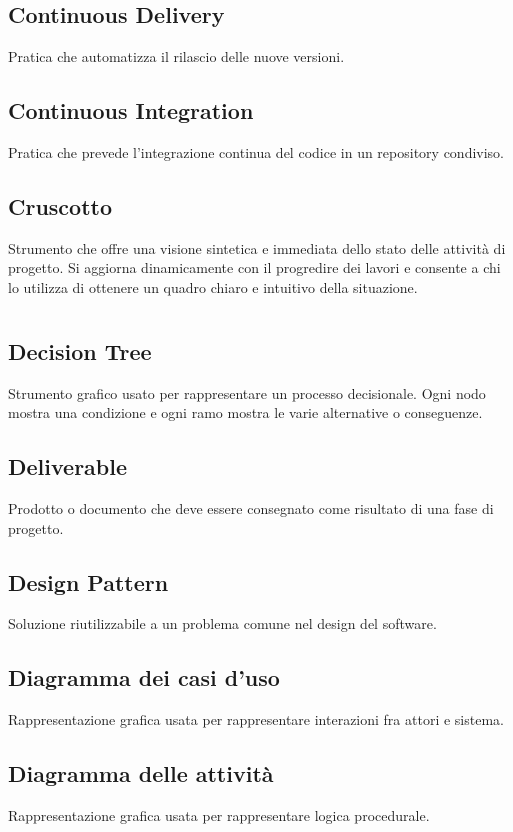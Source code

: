 \documentclass[a4paper,12pt]{article}
\begin{document}
          \subsection*{Continuous Delivery}
			Pratica che automatizza il rilascio delle nuove versioni.
          \subsection*{Continuous Integration}
			Pratica che prevede l'integrazione continua del codice in un repository condiviso.
          \subsection*{Cruscotto}
			Strumento che offre una visione sintetica e immediata dello stato delle attività di progetto. Si aggiorna dinamicamente con il progredire dei lavori e consente a chi lo utilizza di ottenere un quadro chiaro e intuitivo della situazione.
      
  \newpage    
        \section{}
        
          \subsection*{Decision Tree}
			Strumento grafico usato per rappresentare un processo decisionale. Ogni nodo mostra una condizione e ogni ramo mostra le varie alternative o conseguenze.
          \subsection*{Deliverable}
			Prodotto o documento che deve essere consegnato come risultato di una fase di progetto.
          \subsection*{Design Pattern}
			Soluzione riutilizzabile a un problema comune nel design del software.
          \subsection*{Diagramma dei casi d'uso}
			Rappresentazione grafica usata per rappresentare interazioni fra attori e sistema.
          \subsection*{Diagramma delle attività}
			Rappresentazione grafica usata per rappresentare logica procedurale.
\end{document}
